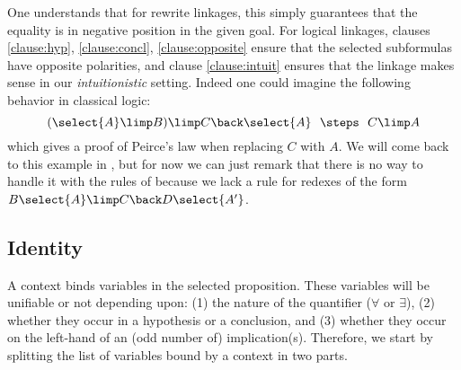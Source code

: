 One understands that for rewrite linkages, this simply guarantees that the
equality is in negative position in the given goal. For logical linkages,
clauses \ref{clause:hyp}, \ref{clause:concl}, \ref{clause:opposite} ensure that
the selected subformulas have opposite polarities, and clause
\ref{clause:intuit} ensures that the linkage makes sense in our
\emph{intuitionistic} setting. Indeed one could imagine the following behavior
in classical logic:
$$(\select{A}\limp B)\limp C\back \select{A}~~\steps~~ C\limp A$$ which gives a
proof of Peirce's law when replacing $C$ with $A$. We will come back to this
example in , but for now we can just remark that there is
no way to handle it with the rules of  because we lack a rule
{} for redexes of the form $B\select{A} \limp C \back
D\select{A'}$.


\subsection{Identity}

A context binds variables in the selected proposition. These variables
will be unifiable or not depending upon: (1) the nature of the quantifier
($\forall$ or $\exists$), (2) whether they occur in a hypothesis or a
conclusion, and (3) whether they occur on the left-hand of an (odd number
of) implication(s). Therefore, we start by splitting the list of
variables bound by a context in two parts.


